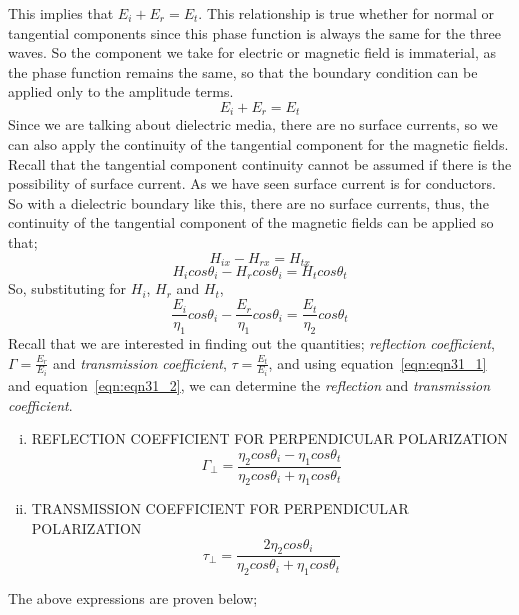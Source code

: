 This implies that $ E_{i} + E_{r} = E_{t}$. This relationship is true whether for normal or tangential components since this phase function is always the same for the three waves. So the component we take for electric or magnetic field is immaterial, as the phase function remains the same, so that the boundary condition can be applied only to the amplitude terms. 
\begin{equation}
E_{i} + E_{r} = E_{t}
\label{eqn:eqn31_1}
\end{equation}
Since we are talking about dielectric media, there are no surface currents, so we can also apply the continuity of the tangential component for the magnetic fields. Recall that the tangential component continuity cannot be assumed if there is the possibility of surface current. As we have seen surface current is for conductors. So with a dielectric boundary like this, there are no surface currents, thus, the continuity of the tangential component of the magnetic fields can be applied so that; 
\begin{equation*}
H_{ix} - H_{rx} = H_{tx}
\end{equation*}
\begin{equation*}
H_{i} cos\theta_{i} - H_{r} cos\theta_{i} = H_{t} cos\theta_{t}
\end{equation*}
So, substituting for $H_{i}$, $H_{r}$ and $H_{t}$,
\begin{equation}
\frac{E_{i}}{\eta_{1}} cos\theta_{i} - \frac{E_{r}}{\eta_{1}} cos\theta_{i} = \frac{E_{t}}{\eta_{2}} cos\theta_{t}
\label{eqn:eqn31_2}
\end{equation}
Recall that we are interested in finding out the quantities; \emph{reflection coefficient}, $\Gamma = \frac{E_{r}}{E_{i}}$ and \emph{transmission coefficient}, $ \tau = \frac{E_{t}}{E_{i}}$, and using equation~\ref{eqn:eqn31_1} and equation~\ref{eqn:eqn31_2}, we can determine the \emph{reflection} and \emph{transmission coefficient}.

\begin{enumerate}[(i)]
\item REFLECTION COEFFICIENT FOR PERPENDICULAR POLARIZATION
$$\Gamma_{\bot} = \frac{\eta_{2} cos\theta_{i} - \eta_{1} cos\theta_{t}}{\eta_{2} cos\theta_{i} + \eta_{1} cos\theta_{t}}$$
\item TRANSMISSION COEFFICIENT FOR PERPENDICULAR POLARIZATION
$$\tau_{\bot} = \frac{2 \eta_{2} cos\theta_{i}}{\eta_{2} cos\theta_{i} + \eta_{1} cos\theta_{t}}$$
\end{enumerate}
The above expressions are proven below;

